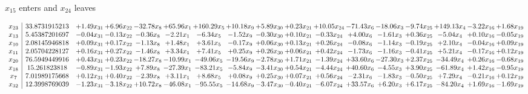\documentclass[9pt]{article}
\begin{document}
 $ x_{15} $ enters and $ x_{24} $ leaves 

 \[\begin{array}{c| c c@{\hskip 2pt} c@{\hskip 2pt} c@{\hskip 2pt} c@{\hskip 2pt} c@{\hskip 2pt} c@{\hskip 2pt} c@{\hskip 2pt} c@{\hskip 2pt} c@{\hskip 2pt} c@{\hskip 2pt} c@{\hskip 2pt} c@{\hskip 2pt} c@{\hskip 2pt} c@{\hskip 2pt} c@{\hskip 2pt} }
 x_{23}   &  33.8731915213 & +  1.49 x_{31} & +  6.96 x_{22} & -32.78 x_{8} & + 65.96 x_{1} & + 160.29 x_{5} & + 10.18 x_{9} & +  5.89 x_{30} & +  0.23 x_{21} & + 10.05 x_{24} & -71.43 x_{6} & -18.06 x_{3} & -9.74 x_{25} & + 149.13 x_{4} & -3.22 x_{16} & +  1.68 x_{19}\\
 x_{13}   &  5.45387201697 & -0.04 x_{31} & -0.13 x_{22} & -0.36 x_{8} & -2.21 x_{1} & -6.34 x_{5} & -1.52 x_{9} & -0.30 x_{30} & +  0.10 x_{21} & -0.33 x_{24} & +  4.00 x_{6} & -1.61 x_{3} & +  0.36 x_{25} & -5.04 x_{4} & +  0.10 x_{16} & -0.05 x_{19}\\
 x_{10}   &  2.08145946818 & +  0.09 x_{31} & +  0.17 x_{22} & -1.13 x_{8} & +  1.48 x_{1} & +  3.61 x_{5} & -0.17 x_{9} & +  0.06 x_{30} & +  0.13 x_{21} & +  0.26 x_{24} & -0.08 x_{6} & -1.14 x_{3} & -0.19 x_{25} & +  2.10 x_{4} & -0.04 x_{16} & +  0.09 x_{19}\\
 x_{11}   &  2.05704228127 & +  0.16 x_{31} & +  0.27 x_{22} & -1.46 x_{8} & +  3.34 x_{1} & +  7.41 x_{5} & +  0.25 x_{9} & +  0.26 x_{30} & +  0.06 x_{21} & +  0.42 x_{24} & -1.73 x_{6} & -1.16 x_{3} & -0.41 x_{25} & +  5.21 x_{4} & -0.17 x_{16} & +  0.12 x_{19}\\
 x_{20}   &  76.5949449916 & +  0.43 x_{31} & +  0.23 x_{22} & -18.27 x_{8} & -10.99 x_{1} & -49.06 x_{5} & -19.56 x_{9} & -2.78 x_{30} & +  1.71 x_{21} & -1.39 x_{24} & + 33.60 x_{6} & -27.30 x_{3} & +  2.37 x_{25} & -34.49 x_{4} & +  0.26 x_{16} & -0.68 x_{19}\\
 x_{18}   &  15.261823818 & -0.89 x_{31} & -1.93 x_{22} & +  7.89 x_{8} & -27.39 x_{1} & -83.21 x_{5} & -5.84 x_{9} & -3.41 x_{30} & +  0.54 x_{21} & -4.44 x_{24} & + 40.60 x_{6} & -4.55 x_{3} & +  3.90 x_{25} & -61.89 x_{4} & +  1.42 x_{16} & -0.95 x_{19}\\
 x_{7}   &  7.01989175668 & +  0.12 x_{31} & +  0.40 x_{22} & -2.39 x_{8} & +  3.11 x_{1} & +  8.68 x_{5} & +  0.08 x_{9} & +  0.25 x_{30} & +  0.07 x_{21} & +  0.56 x_{24} & -2.31 x_{6} & -1.83 x_{3} & -0.50 x_{25} & +  7.29 x_{4} & -0.21 x_{16} & +  0.12 x_{19}\\
 x_{32}   &  12.3998769039 & -1.23 x_{31} & -3.18 x_{22} & + 10.72 x_{8} & -46.08 x_{1} & -95.55 x_{5} & -14.68 x_{9} & -3.47 x_{30} & -0.40 x_{21} & -6.07 x_{24} & + 33.57 x_{6} & +  6.20 x_{3} & +  6.17 x_{25} & -84.20 x_{4} & +  1.69 x_{16} & -1.69 x_{19}\\

\end{array}\]
\end{document}
